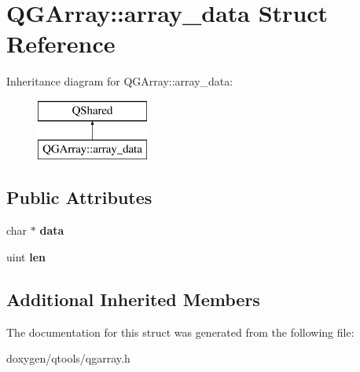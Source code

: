 \hypertarget{struct_q_g_array_1_1array__data}{}\section{Q\+G\+Array\+::array\+\_\+data Struct Reference}
\label{struct_q_g_array_1_1array__data}
Inheritance diagram for Q\+G\+Array\+::array\+\_\+data\+:\begin{figure}[H]
\begin{center}
\leavevmode
\includegraphics[height=2.000000cm]{struct_q_g_array_1_1array__data}
\end{center}
\end{figure}
\subsection*{Public Attributes}
\begin{DoxyCompactItemize}
\item 
\mbox{\label{struct_q_g_array_1_1array__data_adbe9afac5546534042f333048906fe7a}} 
char $\ast$ {\bfseries data}
\item 
\mbox{\label{struct_q_g_array_1_1array__data_a08ad3a7d964f21f6f5b8b33056892bbc}} 
uint {\bfseries len}
\end{DoxyCompactItemize}
\subsection*{Additional Inherited Members}


The documentation for this struct was generated from the following file\+:\begin{DoxyCompactItemize}
\item 
doxygen/qtools/qgarray.\+h\end{DoxyCompactItemize}
